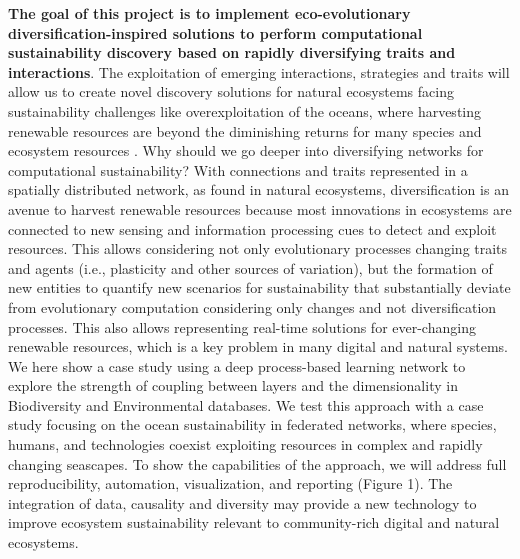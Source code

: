 \documentclass[12pt,a4paper]{article}
\begin{document}
\textbf{The goal of this project is to implement eco-evolutionary diversification-inspired solutions to perform computational sustainability discovery based on rapidly diversifying traits and interactions}. The exploitation of emerging interactions, strategies and traits will allow us to create novel discovery solutions for natural ecosystems facing sustainability challenges like overexploitation of the oceans, where harvesting renewable resources are beyond the diminishing returns for many species and ecosystem resources \cite{Paulyetal1998,Mastrangelo2019}. Why should we go deeper into diversifying networks for computational sustainability? With connections and traits represented in a spatially distributed network, as found in natural ecosystems, diversification is an avenue to harvest renewable resources because most innovations in ecosystems are connected to new sensing and information processing cues to detect and exploit resources. This allows considering not only evolutionary processes changing traits and agents (i.e., plasticity and other sources of variation), but the formation of new entities to quantify new scenarios for sustainability that substantially deviate from evolutionary computation considering only changes and not diversification processes. This also allows representing real-time solutions for ever-changing renewable resources, which is a key problem in many digital and natural systems. We here show a case study using a deep process-based learning network to explore the strength of
coupling between layers and the dimensionality in Biodiversity and Environmental databases. We test this approach with a case study focusing on the ocean sustainability in federated networks, where species, humans, and technologies coexist exploiting resources in complex and rapidly changing seascapes. To show the capabilities of the approach, we will address full reproducibility, automation, visualization, and reporting (Figure 1). The integration of data, causality and diversity may provide a new technology to improve ecosystem sustainability relevant to community-rich digital and natural ecosystems.
\end{document}
